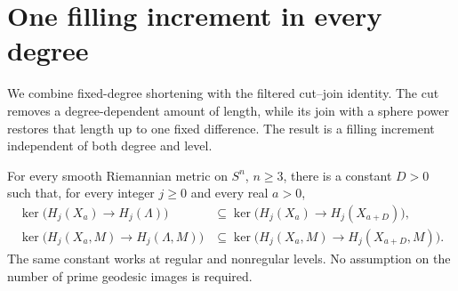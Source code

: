 \section{One filling increment in every degree}\label{sec:ordinary}

We combine fixed-degree shortening with the filtered cut--join identity.
The cut removes a degree-dependent amount of length, while its join with
a sphere power restores that length up to one fixed difference.  The
result is a filling increment independent of both degree and level.

\begin{theorem}\label{thm:ordinary-death}
For every smooth Riemannian metric on $S^n$, $n\ge3$, there is a constant
$D>0$ such that, for every integer $j\ge0$ and every real $a>0$,
\begin{align}
 \ker\bigl(H_j(X_a)\longrightarrow H_j(\Lambda)\bigr)
 &\subseteq
 \ker\bigl(H_j(X_a)\longrightarrow H_j(X_{a+D})\bigr),
 \label{eq:ordinary-absolute}\\
 \ker\bigl(H_j(X_a,M)\longrightarrow H_j(\Lambda,M)\bigr)
 &\subseteq
 \ker\bigl(H_j(X_a,M)\longrightarrow H_j(X_{a+D},M)\bigr).
 \label{eq:ordinary-relative}
\end{align}
The same constant works at regular and nonregular levels.  No assumption
on the number of prime geodesic images is required.
\end{theorem}

